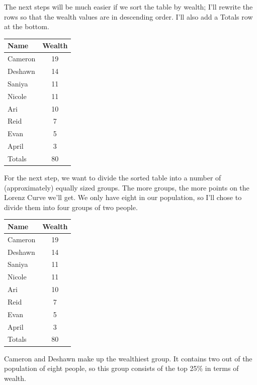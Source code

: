\documentclass[12pt]{memoir}\usepackage[]{graphicx}\usepackage[table]{xcolor}
\begin{document}
The next steps will be much easier if we sort the table by wealth; I'll rewrite
the rows so that the wealth values are in descending order.  I'll also add 
a Totals row at the bottom.
\medskip

\begin{center}
\begin{tabular}{lc}
\toprule
Name & Wealth \\ \midrule
Cameron & 19 \\ \midrule
Deshawn & 14 \\ \midrule
Saniya  & 11 \\ \midrule
Nicole  & 11 \\ \midrule
Ari     & 10 \\ \midrule
Reid    & 7  \\ \midrule
Evan    & 5  \\ \midrule
April   & 3  \\ \bottomrule
Totals  & 80
\end{tabular}
\end{center}
\medskip

For the next step, we want to divide the sorted table into a number of (approximately)
equally sized groups.  The more groups, the more points on the Lorenz Curve we'll get.  
We only have eight in our population, so I'll chose to divide them into four groups
of two people.  

\begin{center}
\begin{tabular}{lc}
\toprule
Name & Wealth \\ \midrule
\rowcolor{gray!50}
Cameron & 19 \\ \midrule
\rowcolor{gray!50}
Deshawn & 14 \\ \midrule
Saniya  & 11 \\ \midrule
Nicole  & 11 \\ \midrule
\rowcolor{gray!50}
Ari     & 10 \\ \midrule
\rowcolor{gray!50}
Reid    & 7  \\ \midrule
Evan    & 5  \\ \midrule
April   & 3  \\ \bottomrule 
Totals  & 80 \\
\end{tabular}
\end{center}

Cameron and Deshawn make up the wealthiest group.  It contains two out of the population
of eight people, so this group consists of the top 25\% in terms of wealth. 
\end{document}
